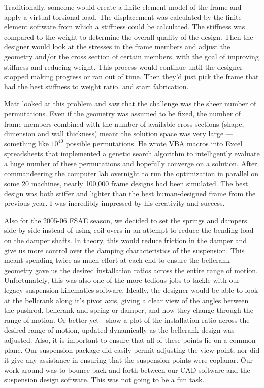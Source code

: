 Traditionally, someone would create a finite element model of the frame and apply a virtual torsional load.  The displacement was calculated by the finite element software from which a stiffness could be calculated.  The stiffness was compared to the weight to determine the overall quality of the design.  Then the designer would look at the stresses in the frame members and adjust the geometry and/or the cross section of certain members, with the goal of improving stiffness and reducing weight.  This process would continue until the designer stopped making progress or ran out of time.  Then they'd just pick the frame that had the best stiffness to weight ratio, and start fabrication.

Matt looked at this problem and saw that the challenge was the sheer number of permutations.  Even if the geometry was assumed to be fixed, the number of frame members combined with the number of available cross sections (shape, dimension and wall thickness) meant the solution space was very large --- something like $10^{40}$ possible permutations.  He wrote VBA macros into Excel spreadsheets that implemented a genetic search algorithm to intelligently evaluate a huge number of these permutations and hopefully converge on a solution.  After commandeering the computer lab overnight to run the optimization in parallel on some 20 machines, nearly 100,000 frame designs had been simulated.  The best design was both stiffer and lighter than the best human-designed frame from the previous year.  I was incredibly impressed by his creativity and success.

Also for the 2005-06 FSAE season, we decided to set the springs and dampers side-by-side instead of using coil-overs in an attempt to reduce the bending load on the damper shafts.  In theory, this would reduce friction in the damper and give us more control over the damping characteristics of the suspension.  This meant spending twice as much effort at each end to ensure the bellcrank geometry gave us the desired installation ratios across the entire range of motion.  Unfortunately, this was also one of the more tedious jobs to tackle with our legacy suspension kinematics software.  Ideally, the designer would be able to look at the bellcrank along it's pivot axis, giving a clear view of the angles between the pushrod, bellcrank and spring or damper, and how they change through the range of motion.  Or better yet - show a plot of the installation ratio across the desired range of motion, updated dynamically as the bellcrank design was adjusted.  Also, it is important to ensure that all of these points lie on a common plane.  Our suspension package did easily permit adjusting the view point, nor did it give any assistance in ensuring that the suspension points were coplanar.  Our work-around was to bounce back-and-forth between our CAD software and the suspension design software.  This was not going to be a fun task.

